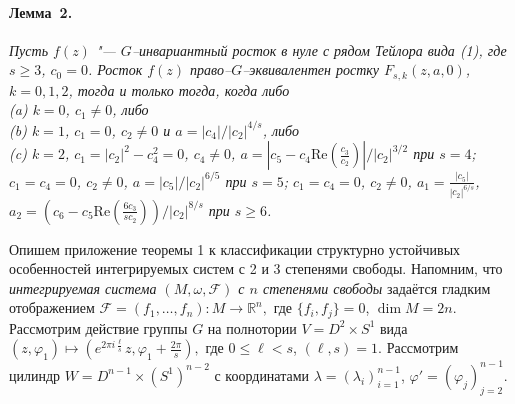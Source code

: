 \medskip
\paragraph{Лемма~2.}
{\it Пусть $f(z)$ "--- $G$--инвариантный росток в нуле с рядом Тейлора вида {\rm(1)}, где
$s\ge3$, $c_0 = 0$.
Росток $f(z)$ право--$G$--эквивалентен ростку $F_{s,k}(z,a,0)$, $k=0,1,2$, тогда и только тогда, когда либо
\\
{\rm(a)} $k=0$,
$c_1 \neq 0$, либо
\\
{\rm(b)} $k=1$,
$c_1 = 0$, $c_2 \ne 0$ и $a=|c_4|/|c_2|^{4/s}$, либо
\\
{\rm(c)} $k=2$,
$c_1 = |c_2|^2-c_4^2 = 0$, $c_4\ne 0$, $a=|c_5-c_4\mathrm{Re}(\frac{c_3}{c_2 })|/|c_2|^{3/2}$ при $s=4$;
$c_1 = c_4 = 0$, $c_2 \neq 0$, $a=|c_5|/|c_2|^{6/5}$ при $s=5$;
$c_1 = c_4 = 0$, $c_2 \neq 0$, $a_1=\frac{|c_5|}{|c_2|^{6/s}}$, $a_2=(c_6-c_5\mathrm{Re}(\frac{6c_3}{sc_2}))/|c_2|^{8/s}$
при $s\ge6$.}

\medskip
Опишем приложение теоремы 1 к классификации структурно устойчивых особенностей интегрируемых систем с 2 и 3 степенями свободы.
Напомним, что {\em интегрируемая система $(M,\omega,\mathcal{F})$ с $n$ степенями свободы}
задаётся гладким отображением $\mathcal{F}=(f_1,\dots,f_n)
: M\to {\mathbb R}^n,$ где $\{f_i,f_j\}=0$, $\dim M=2n$.
%
Рассмотрим
действие группы $G
$ на полнотории $V=D^2\times S^1
$ вида
$
(z,\varphi_1)\mapsto (e^{2\pi i {\frac \ell s}}z,\varphi_1+\frac{2\pi}{s}),
$
где
$0\le\ell<s$, $(\ell,s)=1$. Рассмотрим цилиндр $W=D^{n-1}\times(S^1)^{n-2}$ с координатами $\lambda=(\lambda_i)_{i=1}^{n-1}$, $\varphi'=(\varphi_j)_{j=2}^{n-1}$.

